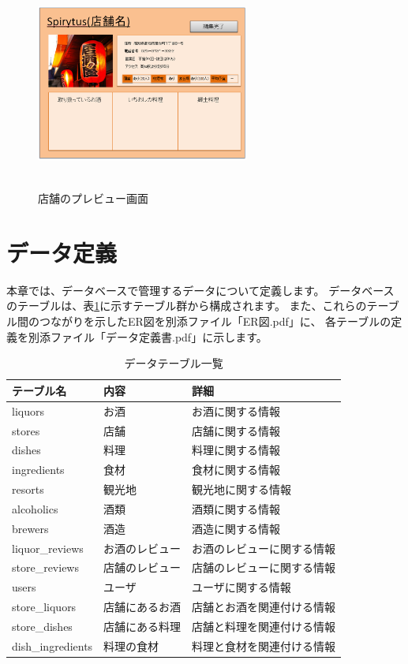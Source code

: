 \documentclass[a4j,titlepage]{jarticle}
\begin{document}
\begin{figure}[htbp]
  \begin{center}
  \includegraphics [height=7cm, width=7cm]{extrnal1_design_document_image/s7.eps}
  \caption{店舗のプレビュー画面}
  \label {fig:s7}
  \end{center}
\end{figure}

\newpage
\section{データ定義}
本章では、データベースで管理するデータについて定義します。
データベースのテーブルは、表\ref{tables}に示すテーブル群から構成されます。
また、これらのテーブル間のつながりを示したER図を別添ファイル「ER図.pdf」に、
各テーブルの定義を別添ファイル「データ定義書.pdf」に示します。
​
\begin{table}[!htbp]
\caption{データテーブル一覧}
\label{tables}
\begin{center}
\begin{tabular}{|l|l|l|}\hline
テーブル名 & 内容 & 詳細\\\hline\hline
liquors & お酒 & お酒に関する情報\\\hline
stores & 店舗 & 店舗に関する情報\\\hline
dishes & 料理 & 料理に関する情報\\\hline
ingredients & 食材 & 食材に関する情報\\\hline
resorts & 観光地 & 観光地に関する情報\\\hline
alcoholics & 酒類 & 酒類に関する情報\\\hline
brewers & 酒造 & 酒造に関する情報\\\hline
liquor\_reviews & お酒のレビュー & お酒のレビューに関する情報\\\hline
store\_reviews & 店舗のレビュー & 店舗のレビューに関する情報\\\hline
users & ユーザ & ユーザに関する情報\\\hline
store\_liquors & 店舗にあるお酒 & 店舗とお酒を関連付ける情報\\\hline
store\_dishes & 店舗にある料理 & 店舗と料理を関連付ける情報\\\hline
dish\_ingredients & 料理の食材 & 料理と食材を関連付ける情報\\\hline
\end{tabular}
\end{center}
\end{table}
\end{document}
